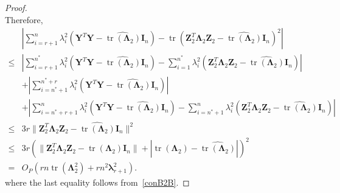 \documentclass[12pt]{article} %
\DeclareMathOperator{\mytr}{tr}
\newcommand{\bZ}{\mathbf{Z}}
\newcommand{\bY}{\mathbf{Y}}
\newcommand{\bI}{\mathbf{I}}
\newcommand{\bfsym}[1]{\ensuremath{\boldsymbol{#1}}}
\def\blambda {\bfsym {\lambda}}
\def\bLambda {\bfsym {\Lambda}}
\theoremstyle{definition}
\begin{document}
\begin{appendices}
\begin{proof}
\begin{equation*}
    \end{equation*}
    Therefore,
    \begin{equation}\label{abcd0}
        \begin{split}
            &\left|
            \sum_{i=r+1}^n \lambda_i^2\left(\bY^T \bY-\widehat{\mytr(\bLambda_2)}\bI_n\right)
            -\mytr(\bZ_2^T \bLambda_2 \bZ_2-\widehat{\mytr(\bLambda_2)}\bI_n)^2
            \right|
            \\
            \leq&
            \left|
            \sum_{i=r+1}^{n^*} \lambda_i^2\left(\bY^T \bY-\widehat{\mytr(\bLambda_2)}\bI_n\right)
            -\sum_{i=1}^{n^*}\lambda_i^2\left(\bZ_2^T \bLambda_2 \bZ_2-\widehat{\mytr(\bLambda_2)}\bI_n\right)
            \right|
            \\
            &+
            \left|
            \sum_{i=n^*+1}^{n^* +r} \lambda_i^2\left(\bY^T \bY-\widehat{\mytr(\bLambda_2)}\bI_n\right)
            \right|
            \\
            &+
            \left|
            \sum_{i=n^*+r+1}^{n} \lambda_i^2\left(\bY^T \bY-\widehat{\mytr(\bLambda_2)}\bI_n\right)
            -\sum_{i=n^*+1}^{n}\lambda_i^2\left(\bZ_2^T \bLambda_2 \bZ_2-\widehat{\mytr(\bLambda_2)}\bI_n\right)
            \right|
            \\
            \leq & 3r \|\bZ_2^T \bLambda_2 \bZ_2-\widehat{\mytr(\bLambda_2)}\bI_n\|^2\\
            \leq & 3r \left(\|\bZ_2^T \bLambda_2 \bZ_2-\mytr(\bLambda_2)\bI_n\|+\left|\mytr(\bLambda_2)-\widehat{\mytr(\bLambda_2)}\right|\right)^2\\
            = & 
            O_P\left(rn \mytr(\bLambda_2^2) + r n^2 \blambda_{r+1}^2\right)
            .
        \end{split}
    \end{equation}
    where the last equality follows from~\eqref{conB2B}.


\end{proof}
\end{appendices}
\end{document}
